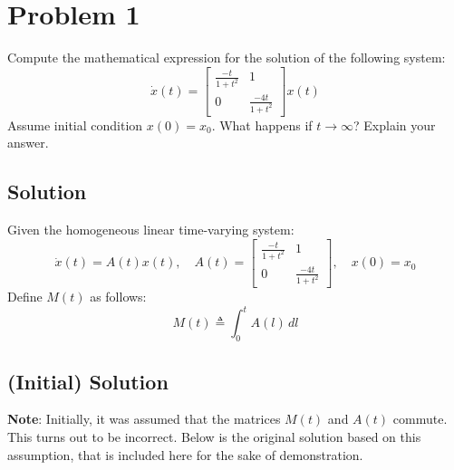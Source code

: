 \section*{Problem 1}

Compute the mathematical expression for the solution of the following system:
\begin{equation*}
    \dot x(t)
    =
    \begin{bmatrix}
        \frac{-t}{1+t^2} & 1                 \\
        0                & \frac{-4t}{1+t^2}
    \end{bmatrix}
    x(t)
\end{equation*}
Assume initial condition \( x(0) = x_0 \).
What happens if \( t \rightarrow \infty \)?
Explain your answer.

\subsection*{Solution}

Given the homogeneous linear time-varying system:
\begin{equation*}
    \dot{x}(t)
    =
    A(t) x(t),
    \quad
    A(t)
    =
    \begin{bmatrix}
        \frac{-t}{1+t^2} & 1                 \\
        0                & \frac{-4t}{1+t^2}
    \end{bmatrix},
    \quad
    x(0) = x_0
\end{equation*}
Define \( M(t) \) as follows:
\begin{equation*}
    M(t)
    \triangleq
    \int_{0}^{t} A(l) \, dl
\end{equation*}

\clearpage
\subsection*{(Initial) Solution}

\textbf{Note}: Initially, it was assumed that the matrices \( M(t) \) and \( A(t) \) commute.
This turns out to be incorrect.
Below is the original solution based on this assumption, that is included here for the sake of demonstration.

